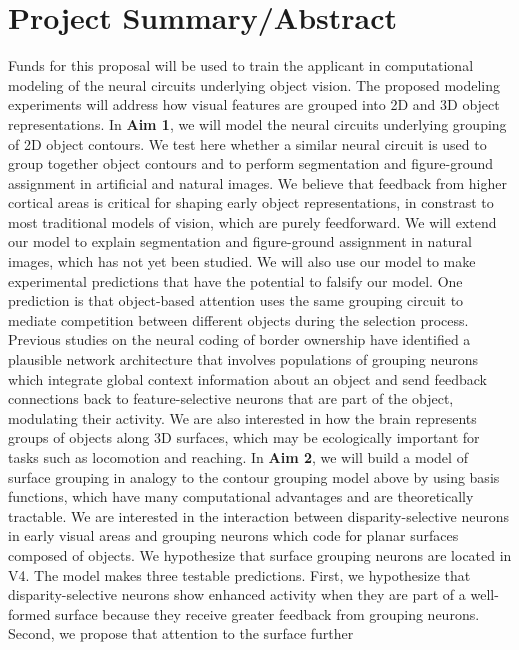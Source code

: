 \documentclass[11pt,notitlepage]{article}
\begin{document}
\section*{Project Summary/Abstract}
Funds for this proposal will be used to train the applicant in
computational modeling of the neural circuits underlying object
vision. The proposed modeling experiments will address how visual
features are grouped into 2D and 3D object representations. In
\textbf{Aim 1}, we will model the neural circuits underlying grouping
of 2D object contours. We test here whether a similar neural circuit
is used to group together object contours and
    to perform segmentation and figure-ground assignment in artificial
    and natural images. We believe that feedback from
higher cortical areas is critical for shaping early object
representations, in constrast to
most traditional models of vision, which are purely feedforward.
We will extend our model to explain segmentation and figure-ground
assignment in natural images, which has not yet been studied. We will
also use our model to make experimental predictions that have the
potential to falsify our model. One prediction is that object-based
attention uses the same grouping circuit to mediate competition
between different objects during the selection process.  
Previous studies on the neural coding of border ownership have
identified a plausible network architecture that involves populations
of grouping neurons which integrate global context information about
an object and send feedback connections back to feature-selective
neurons that are part of the object, modulating their activity.  We
are also interested in how the brain represents groups of objects
along 3D surfaces, which may be ecologically important for tasks such
as locomotion and reaching. In \textbf{Aim 2}, we will build a model
of surface grouping in analogy to the contour grouping model above by
using basis functions, which have many
    computational advantages and are theoretically
    tractable. We are interested in the interaction between
disparity-selective neurons in early visual areas and grouping neurons
which code for planar surfaces composed of objects. We hypothesize
that surface grouping neurons are located in V4. 
The model makes three
testable predictions. First, we hypothesize that disparity-selective
neurons show enhanced activity when they are part of a well-formed
surface because they receive greater feedback from grouping
neurons. Second, we propose that attention to the surface further
\end{document}

